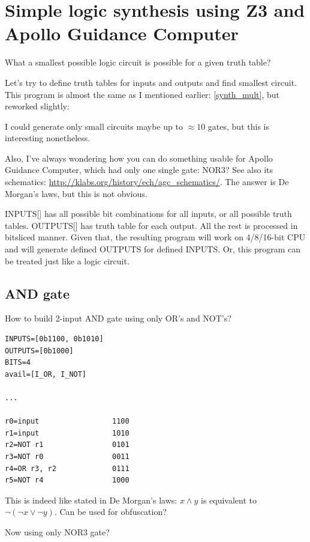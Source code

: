 \section{Simple logic synthesis using Z3 and Apollo Guidance Computer}

What a smallest possible logic circuit is possible for a given truth table?

Let's try to define truth tables for inputs and outputs and find smallest circuit.
This program is almost the same as I mentioned earlier: \ref{synth_mult}, but reworked slightly:



I could generate only small circuits maybe up to $\approx 10$ gates, but this is interesting nonetheless.

Also, I've always wondering how you can do something usable for Apollo Guidance Computer,
which had only one single gate: NOR3?
See also its schematics: \url{http://klabs.org/history/ech/agc_schematics/}.
The answer is De Morgan's laws, but this is not obvious.

INPUTS[] has all possible bit combinations for all inputs, or all possible truth tables. OUTPUTS[] has truth table for each output.
All the rest is processed in bitsliced manner.
Given that, the resulting program will work on 4/8/16-bit CPU and will generate defined OUTPUTS for defined INPUTS.
Or, this program can be treated just like a logic circuit.

\subsection{AND gate}

How to build 2-input AND gate using only OR's and NOT's?

\begin{lstlisting}
INPUTS=[0b1100, 0b1010]
OUTPUTS=[0b1000]
BITS=4
avail=[I_OR, I_NOT]

...

r0=input                 1100
r1=input                 1010
r2=NOT r1                0101
r3=NOT r0                0011
r4=OR r3, r2             0111
r5=NOT r4                1000
\end{lstlisting}

This is indeed like stated in De Morgan's laws: $x \wedge y$ is equivalent to $\neg (\neg x \vee \neg y)$.
Can be used for obfuscation?

Now using only NOR3 gate?


